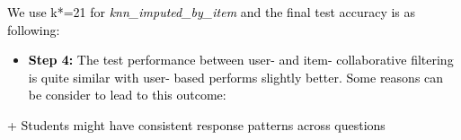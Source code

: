 \documentclass[letterpaper]{article}
\begin{document}





\textcolor{black}{We use k*=21 for }\textit{\textcolor{black}{knn\_imputed\_by\_item}}\textcolor{black}{ and the final
test accuracy is as following:}




\begin{itemize}[series=listWWNumiii,label=[F0B7?]]
\item \textbf{\textcolor{black}{Step 4:}}\textcolor{black}{ The test performance between user- and item- collaborative
filtering is quite similar with user- based performs slightly better. Some reasons can be consider to lead to this
outcome:}
\end{itemize}
\textcolor{black}{+ Students might have consistent response patterns across questions}
\end{document}

